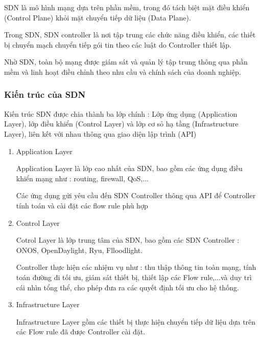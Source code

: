 SDN là mô hình mạng dựa trên phần mềm, trong đó tách biệt mặt điều khiển (Control Plane) khỏi mặt chuyển tiếp dữ liệu (Data Plane).

Trong SDN, SDN controller là nơi tập trung các chức năng điều khiển, các thiết bị chuyển mạch chuyển tiếp gói tin theo các luật do Controller thiết lập.

Nhờ SDN, toàn bộ mạng được giám sát và quản lý tập trung thông qua phần mềm và linh hoạt điều chỉnh theo nhu cầu và chính sách của doanh nghiệp.

\subsubsection{Kiến trúc của SDN}

Kiến trúc SDN được chia thành ba lớp chính : Lớp ứng dụng (Application Layer), lớp điều khiển (Control Layer) và lớp cơ sỏ hạ tầng (Infrastructure Layer), liên kết với nhau thông qua giao diện lập trình (API)
\begin{enumerate}
  \item Application Layer
  
  Application Layer là lớp cao nhất của SDN, bao gồm các ứng dụng điều khiển mạng như : routing, firewall, QoS,...
  
  Các ứng dụng gửi yêu cầu đến SDN Controller thông qua API để Controller tính toán và cài đặt các flow rule phù hợp
  
  \item Control Layer 
  
  Cotrol Layer là lớp trung tâm của SDN, bao gồm các SDN Controller : ONOS, OpenDaylight, Ryu, Flloodlight.

  Controller thực hiện các nhiệm vụ như : thu thập thông tin toàn mạng, tính toán đường đi tối ưu, giám sát thiết bị, thiết lập các Flow rule,...và duy trì cái nhìn tổng thể, cho phép đưa ra các quyết định tối ưu cho hệ thống.
  
  \item Infrastructure Layer
  
  Infrastructure Layer gồm các thiết bị thực hiện chuyển tiếp dữ liệu dựa trên các Flow rule đã được Controller cài đặt.
\end{enumerate}
